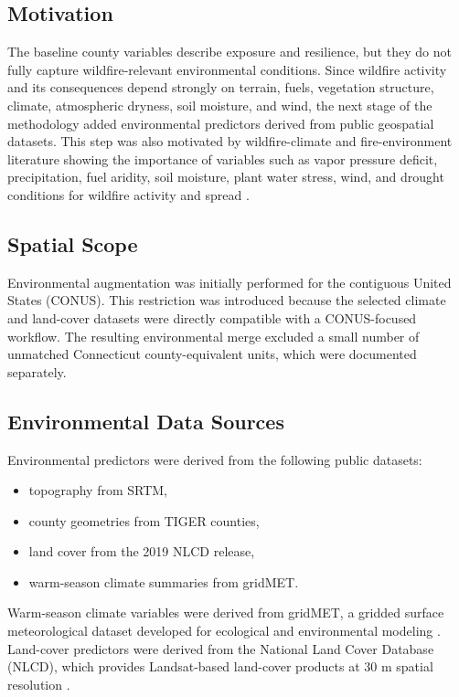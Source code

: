 \subsection{Motivation}

The baseline county variables describe exposure and resilience, but they do not fully capture wildfire-relevant environmental conditions. Since wildfire activity and its consequences depend strongly on terrain, fuels, vegetation structure, climate, atmospheric dryness, soil moisture, and wind, the next stage of the methodology added environmental predictors derived from public geospatial datasets. This step was also motivated by wildfire-climate and fire-environment literature showing the importance of variables such as vapor pressure deficit, precipitation, fuel aridity, soil moisture, plant water stress, wind, and drought conditions for wildfire activity and spread \citep{abatzoglou2016anthropogenic,williams2019observed,holden2025soilmoisture,beltranmarcos2026drivers}.

\subsection{Spatial Scope}

Environmental augmentation was initially performed for the contiguous United States (CONUS). This restriction was introduced because the selected climate and land-cover datasets were directly compatible with a CONUS-focused workflow. The resulting environmental merge excluded a small number of unmatched Connecticut county-equivalent units, which were documented separately.

\subsection{Environmental Data Sources}

Environmental predictors were derived from the following public datasets:
\begin{itemize}
    \item topography from SRTM,
    \item county geometries from TIGER counties,
    \item land cover from the 2019 NLCD release,
    \item warm-season climate summaries from gridMET.
\end{itemize}

Warm-season climate variables were derived from gridMET, a gridded surface meteorological dataset developed for ecological and environmental modeling \citep{abatzoglou2013gridmet}. Land-cover predictors were derived from the National Land Cover Database (NLCD), which provides Landsat-based land-cover products at 30 m spatial resolution \citep{dewitz2021nlcd}.

